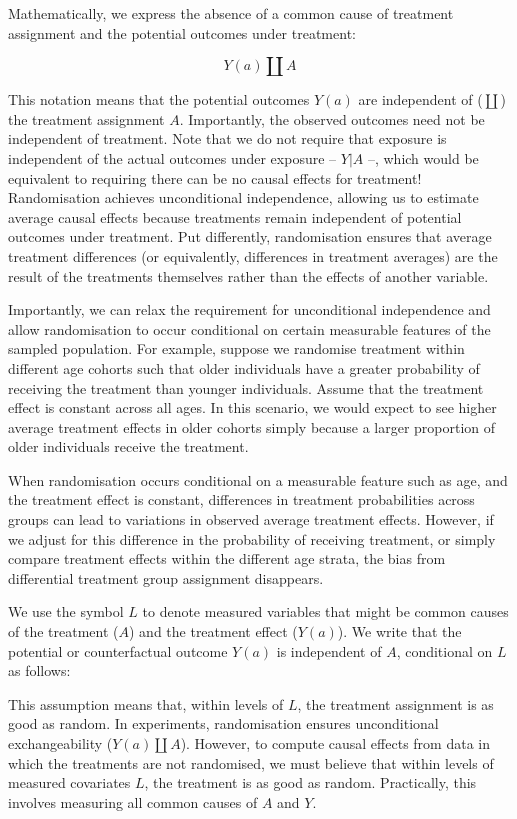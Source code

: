 \documentclass[
  singlecolumn]{article}
\begin{document}
Mathematically, we express the absence of a common cause of treatment
assignment and the potential outcomes under treatment:

\[
Y(a) \coprod A
\]

This notation means that the potential outcomes \(Y(a)\) are independent
of (\(\coprod\)) the treatment assignment \(A\). Importantly, the
observed outcomes need not be independent of treatment. Note that we do
not require that exposure is independent of the actual outcomes under
exposure -- \(Y|A\) --, which would be equivalent to requiring there can
be no causal effects for treatment! Randomisation achieves unconditional
independence, allowing us to estimate average causal effects because
treatments remain independent of potential outcomes under treatment. Put
differently, randomisation ensures that average treatment differences
(or equivalently, differences in treatment averages) are the result of
the treatments themselves rather than the effects of another variable.

Importantly, we can relax the requirement for unconditional independence
and allow randomisation to occur conditional on certain measurable
features of the sampled population. For example, suppose we randomise
treatment within different age cohorts such that older individuals have
a greater probability of receiving the treatment than younger
individuals. Assume that the treatment effect is constant across all
ages. In this scenario, we would expect to see higher average treatment
effects in older cohorts simply because a larger proportion of older
individuals receive the treatment.

When randomisation occurs conditional on a measurable feature such as
age, and the treatment effect is constant, differences in treatment
probabilities across groups can lead to variations in observed average
treatment effects. However, if we adjust for this difference in the
probability of receiving treatment, or simply compare treatment effects
within the different age strata, the bias from differential treatment
group assignment disappears.

We use the symbol \(L\) to denote measured variables that might be
common causes of the treatment (\(A\)) and the treatment effect
(\(Y(a)\)). We write that the potential or counterfactual outcome
\(Y(a)\) is independent of \(A\), conditional on \(L\) as follows:

This assumption means that, within levels of \(L\), the treatment
assignment is as good as random. In experiments, randomisation ensures
unconditional exchangeability (\(Y(a) \coprod  A\)). However, to compute
causal effects from data in which the treatments are not randomised, we
must believe that within levels of measured covariates \(L\), the
treatment is as good as random. Practically, this involves measuring all
common causes of \(A\) and \(Y\).
\end{document}
